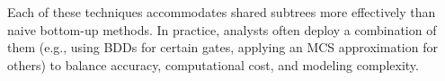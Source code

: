 Each of these techniques accommodates shared subtrees more effectively than naive bottom-up methods.  In practice, analysts often deploy a combination of them (e.g., using BDDs for certain gates, applying an MCS approximation for others) to balance accuracy, computational cost, and modeling complexity.